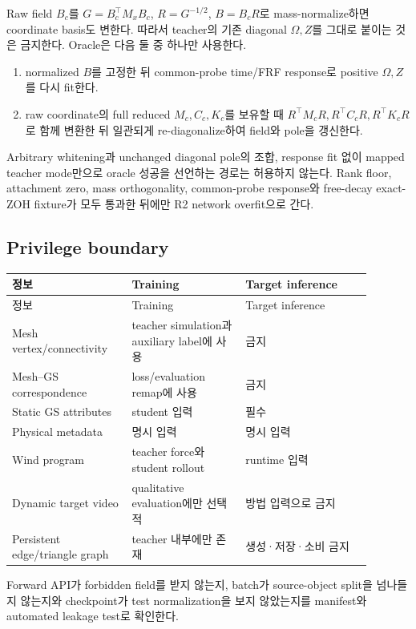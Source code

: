 \documentclass[11pt]{article}
\begin{document}
Raw field \(B_c\)를 \(G=B_c^\top M_xB_c\), \(R=G^{-1/2}\),
\(B=B_cR\)로 mass-normalize하면 coordinate basis도 변한다. 따라서 teacher의 기존 diagonal
\(\Omega,Z\)를 그대로 붙이는 것은 금지한다. Oracle은 다음 둘 중 하나만 사용한다.
\begin{enumerate}
  \item normalized \(B\)를 고정한 뒤 common-probe time/FRF response로 positive
  \(\Omega,Z\)를 다시 fit한다.
  \item raw coordinate의 full reduced \(M_c,C_c,K_c\)를 보유할 때
  \(R^\top M_cR,R^\top C_cR,R^\top K_cR\)로 함께 변환한 뒤 일관되게
  re-diagonalize하여 field와 pole을 갱신한다.
\end{enumerate}
Arbitrary whitening과 unchanged diagonal pole의 조합, response fit 없이 mapped teacher mode만으로
oracle 성공을 선언하는 경로는 허용하지 않는다. Rank floor, attachment zero, mass orthogonality,
common-probe response와 free-decay exact-ZOH fixture가 모두 통과한 뒤에만 R2 network overfit으로 간다.

\subsection{Privilege boundary}

\begin{longtable}{L{0.29\linewidth}L{0.29\linewidth}L{0.31\linewidth}}
\toprule
정보 & Training & Target inference\\
\midrule
\endfirsthead
\toprule
정보 & Training & Target inference\\
\midrule
\endhead
Mesh vertex/connectivity & teacher simulation과 auxiliary label에 사용 & 금지\\
Mesh--GS correspondence & loss/evaluation remap에 사용 & 금지\\
Static GS attributes & student 입력 & 필수\\
Physical metadata & 명시 입력 & 명시 입력\\
Wind program & teacher force와 student rollout & runtime 입력\\
Dynamic target video & qualitative evaluation에만 선택적 & 방법 입력으로 금지\\
Persistent edge/triangle graph & teacher 내부에만 존재 & 생성·저장·소비 금지\\
\bottomrule
\end{longtable}

Forward API가 forbidden field를 받지 않는지, batch가 source-object split을 넘나들지 않는지와
checkpoint가 test normalization을 보지 않았는지를 manifest와 automated leakage test로 확인한다.
\end{document}
